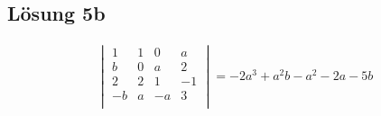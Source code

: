 \documentclass[main.tex]{subfiles}
\begin{document}
\subsection{Lösung 5b}

\begin{align*}
    \begin{vmatrix}
        1 & 1 &  0 &  a \\
        b & 0 &  a &  2 \\
        2 & 2 &  1 & -1 \\
       -b & a & -a &  3 \\
   \end{vmatrix} = -2 a^3 + a^2 b - a^2 - 2 a - 5 b\\
\end{align*}
\end{document}
